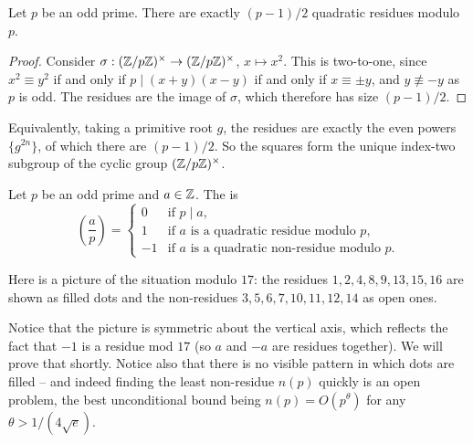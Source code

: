 \documentclass[a4paper]{scrartcl}
\newcommand{\leg}[2]{\left( \frac{#1}{#2} \right)}
\begin{document}
\begin{lemma}\label{lem:halfqr}
	Let $p$ be an odd prime. There are exactly $(p-1)/2$ quadratic residues modulo $p$.
\end{lemma}
\begin{proof}
	Consider $\sigma : (\mathbb{Z}/p\mathbb{Z})^\times \to (\mathbb{Z}/p\mathbb{Z})^\times$, $x \mapsto x^2$. This is two-to-one, since $x^2 \equiv y^2$ if and only if $p \mid (x+y)(x-y)$ if and only if $x \equiv \pm y$, and $y \not\equiv -y$ as $p$ is odd. The residues are the image of $\sigma$, which therefore has size $(p-1)/2$.
\end{proof}

\begin{remark}
	Equivalently, taking a primitive root $g$, the residues are exactly the even powers $\{g^{2n}\}$, of which there are $(p-1)/2$. So the squares form the unique index-two subgroup of the cyclic group $(\mathbb{Z}/p\mathbb{Z})^\times$.
\end{remark}

\begin{definition}
	Let $p$ be an odd prime and $a \in \mathbb{Z}$. The  is
	$$
	\leg ap = \begin{cases}
		0 & \text{if } p \mid a, \\
		1 & \text{if } a \text{ is a quadratic residue modulo } p, \\
		-1 & \text{if } a \text{ is a quadratic non-residue modulo } p.
	\end{cases}
	$$
\end{definition}

Here is a picture of the situation modulo $17$: the residues $1, 2, 4, 8, 9, 13, 15, 16$ are shown as filled dots and the non-residues $3, 5, 6, 7, 10, 11, 12, 14$ as open ones.

\begin{center}
\end{center}

Notice that the picture is symmetric about the vertical axis, which reflects the fact that $-1$ is a residue mod $17$ (so $a$ and $-a$ are residues together). We will prove that shortly. Notice also that there is no visible pattern in which dots are filled -- and indeed finding the least non-residue $n(p)$ quickly is an open problem, the best unconditional bound being $n(p) = O(p^\theta)$ for any $\theta > 1/(4\sqrt e)$.
\end{document}
